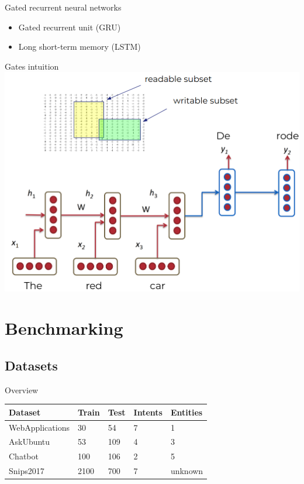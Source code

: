\documentclass[pdf]{beamer}
\newcommand{\entity}[1]{\textcolor{ao(english)}{#1}}
\newcommand{\intent}[1]{\textcolor{azure(colorwheel)}{#1}}
\begin{document}
    \begin{frame}{Gated recurrent neural networks}
      \begin{itemize}
      \item Gated recurrent unit (GRU) \\[3mm]
        \item Long short-term memory (LSTM)
      \end{itemize}
    \end{frame}
    
    \begin{frame}{Gates intuition}
        \includegraphics[height=0.9\textheight]{figures/gru.png}
    \end{frame}

    \section{Benchmarking}
    \subsection{Datasets}
    \begin{frame}{Overview}
        \begin{tabular}{l l l l l}
            \textbf{Dataset} & \textbf{Train} & \textbf{Test} & \textbf{\intent{Intents}} & \textbf{\entity{Entities}}\\
            \hline
            WebApplications & 30 & 54 & 7 & 1\\
            AskUbuntu & 53 & 109 & 4 & 3\\
            Chatbot & 100 & 106 & 2 & 5\\
            Snips2017 & 2100 & 700 & 7 & unknown\\
        \end{tabular}
    \end{frame}
\end{document}

